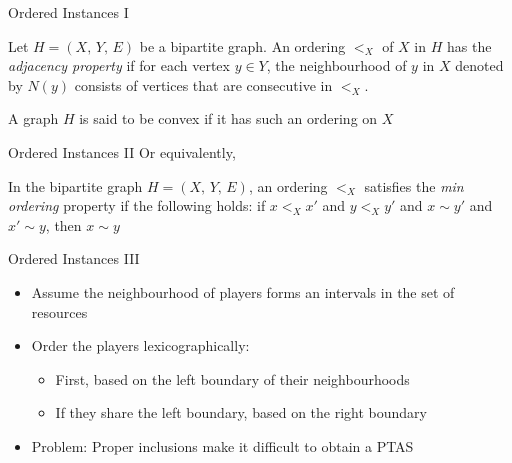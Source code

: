 \documentclass[10pt]{beamer}
\begin{document}
\begin{frame}{Ordered Instances I}
	\begin{definition}
    	Let $H = (X, \, Y, \, E)$ be a bipartite graph. An ordering $<_X$ of $X$ in $H$ has the \emph{adjacency property} if for each vertex $y \in Y$, the neighbourhood of $y$ in $X$ denoted by $N(y)$ consists of vertices that are consecutive in $<_X$.	
	\end{definition}
    A graph $H$ is said to be \alert{convex} if it has such an ordering on $X$
\end{frame}

\begin{frame}{Ordered Instances II}
    Or equivalently, 
    \begin{definition}
    	In the bipartite graph $H = (X, \, Y, \, E)$, an ordering $<_X$ satisfies the \emph{min ordering} property if the following holds: if $x <_X x'$ and $y <_X y'$ and $x \sim y'$ and $x' \sim y$, then \alert{$x \sim y$}
    	\begin{figure}
		\end{figure}
    \end{definition}
\end{frame}

\begin{frame}{Ordered Instances III}
	\begin{itemize}
    	\item<1-> Assume the neighbourhood of players forms an intervals in the set of resources
        \item<2-> Order the players lexicographically:
       	\begin{itemize}
        	\item<3-> First, based on the \alert{left boundary} of their neighbourhoods
            \item<4-> If they share the left boundary, based on the \alert{right boundary}
        \end{itemize}
        \item<5-> \alert{Problem:} Proper inclusions make it difficult to obtain a PTAS
    \end{itemize}
\end{frame}
\end{document}
